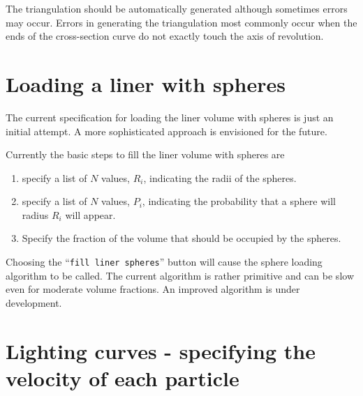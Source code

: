 \documentclass[12pt]{article}
\newcommand{\cmd}[1]{``{\tt #1}''}
\begin{document}
The triangulation should be automatically generated although sometimes errors may occur.
Errors in generating the triangulation most commonly occur when the ends of the 
cross-section curve do not exactly touch the axis of revolution.


\section{Loading a liner with spheres}

The current specification for loading the liner volume with spheres is just an initial
attempt. A more sophisticated approach is envisioned for the future.

Currently the basic steps to fill the liner volume with spheres are
\begin{enumerate}
  \item specify a list of $N$ values, $R_i$,  indicating the radii of the spheres. 
  \item specify a list of $N$ values, $P_i$, indicating the probability that a sphere will radius $R_i$
            will appear.
  \item Specify the fraction of the volume that should be occupied by the spheres.
\end{enumerate}

Choosing the \cmd{fill liner spheres} button will cause the sphere loading algorithm to be 
called. The current algorithm is rather primitive and can be slow even for moderate volume
fractions. An improved algorithm is under development.



\clearpage
\section{Lighting curves - specifying the velocity of each particle}\label{sec:lighting}
\end{document}
